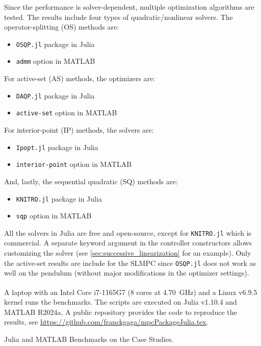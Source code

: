 Since the performance is solver-dependent, multiple optimization algorithms are tested. The results include four types of quadratic/nonlinear solvers. The operator-splitting (OS) methods are: 
\begin{itemize}
    \item \texttt{OSQP.jl} package in Julia \citep{osqp}
    \item \texttt{admm} option in MATLAB \citep{admm}
\end{itemize}
For active-set (AS) methods, the optimizers are: 
\begin{itemize}
    \item \texttt{DAQP.jl} package in Julia \citep{daqp}
    \item \texttt{active-set} option in MATLAB \citep{activeset}
\end{itemize}
For interior-point (IP) methods, the solvers are: 
\begin{itemize}
    \item \texttt{Ipopt.jl} package in Julia \citep{ipopt}
    \item \texttt{interior-point} option in MATLAB \citep{interiorpoint}
\end{itemize}
And, lastly, the sequential quadratic (SQ) methods are:
\begin{itemize}
    \item \texttt{KNITRO.jl} package in Julia \citep{knitro}
    \item \texttt{sqp} option in MATLAB \citep{sqp}
\end{itemize}

All the solvers in Julia are free and open-source, except for \texttt{KNITRO.jl} which is commercial. A separate keyword argument in the controller constructors allows customizing the solver (see \cref{sec:successive_linearization} for an example). Only the active-set results are include for the SLMPC since \texttt{OSQP.jl} does not work as well on the pendulum (without major modifications in the optimizer settings).

A laptop with an Intel\textsuperscript{\textregistered} Core\textsuperscript{\texttrademark} i7-1165G7 (8 cores at \SI{4.70}{\giga\hertz}) and a Linux v6.9.5 kernel runs the benchmarks. The scripts are executed on Julia v1.10.4 and MATLAB R2024a. A public repository provides the code to reproduce the results, see \url{https://github.com/franckgaga/mpcPackageJulia.tex}.

\begin{table}
    \centering
    \caption{Julia and MATLAB Benchmarks on the Case Studies.}
    \vspace{0.5em}
    \label{tab:benchamrks}
    \centering
    
\end{table}


